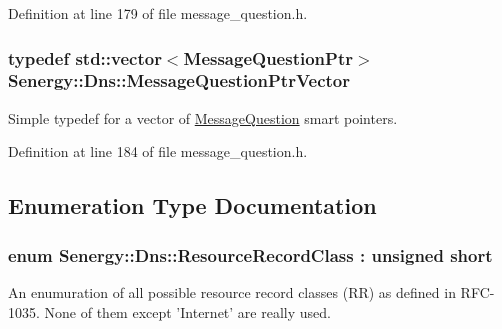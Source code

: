 Definition at line 179 of file message\-\_\-question.\-h.

\hypertarget{namespace_senergy_1_1_dns_a76982150ca0b86c08d888f3e3e805747}{
\subsubsection[{Message\-Question\-Ptr\-Vector}]{\setlength{\rightskip}{0pt plus 5cm}typedef std\-::vector$<${\bf Message\-Question\-Ptr}$>$ {\bf Senergy\-::\-Dns\-::\-Message\-Question\-Ptr\-Vector}}}\label{namespace_senergy_1_1_dns_a76982150ca0b86c08d888f3e3e805747}


Simple typedef for a vector of \hyperlink{class_senergy_1_1_dns_1_1_message_question}{Message\-Question} smart pointers. 



Definition at line 184 of file message\-\_\-question.\-h.



\subsection{Enumeration Type Documentation}
\hypertarget{namespace_senergy_1_1_dns_a953f153bc411213d621d00c1e1b3eb9d}{
\subsubsection[{Resource\-Record\-Class}]{\setlength{\rightskip}{0pt plus 5cm}enum {\bf Senergy\-::\-Dns\-::\-Resource\-Record\-Class} \-: unsigned short\hspace{0.3cm}{\ttfamily [strong]}}}\label{namespace_senergy_1_1_dns_a953f153bc411213d621d00c1e1b3eb9d}


An enumuration of all possible resource record classes (R\-R) as defined in R\-F\-C-\/1035. None of them except 'Internet' are really used. 

